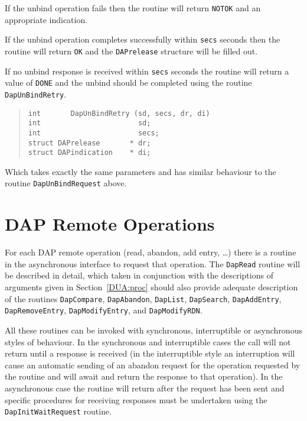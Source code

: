 If the unbind operation fails then the routine will return \verb"NOTOK"
and an appropriate indication.

If the unbind operation completes successfully within \verb"secs"
seconds then the routine will return \verb"OK" and the \verb"DAPrelease"
structure will be filled out.

If no unbind response is received within \verb"secs" seconds the routine
will return a value of \verb"DONE" and the unbind should be completed
using the routine \verb"DapUnBindRetry".

\begin{quote}\small\begin{verbatim}
int       DapUnBindRetry (sd, secs, dr, di)
int                       sd;
int                       secs;
struct DAPrelease       * dr;
struct DAPindication    * di;
\end{verbatim}\end{quote}

Which takes exactly the same parameters and has similar behaviour to the
routine \verb"DapUnBindRequest" above.

\section {DAP Remote Operations}

For each DAP remote operation (read, abandon, add entry, \ldots) there
is a routine in the asynchronous interface to request that operation.
The \verb"DapRead" routine will be described in detail, which taken in
conjunction with the descriptions of arguments given in
Section~\ref{DUA:proc} should
also provide adequate description of the routines \verb"DapCompare",
\verb"DapAbandon", \verb"DapList", \verb"DapSearch", \verb"DapAddEntry",
\verb"DapRemoveEntry", \verb"DapModifyEntry", and \verb"DapModifyRDN".

All these routines can be invoked with synchronous, interruptible or
asynchronous styles of behaviour. In the synchronous and interruptible
cases the call will not return until a response is received (in the
interruptible style an interruption will cause an automatic sending
of an abandon request for the operation requested by the routine and
will await and return the response to that operation).
In the asynchronous case the routine will return after the request
has been sent and specific procedures for receiving responses must be
undertaken using the \verb"DapInitWaitRequest" routine.

